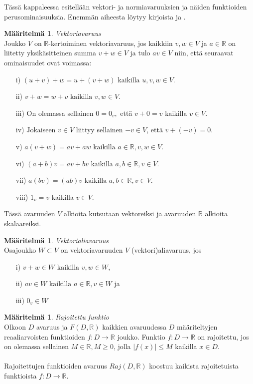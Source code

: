\documentclass[12pt,a4paper,leqno]{report}
\newcommand{\R}{\mathbb{R}}
\newcommand{\N}{\mathbb{N}}
\theoremstyle{plain}
\theoremstyle{definition}
\newtheorem{maar}[equation]{Määritelmä}
\newtheorem{esim}[equation]{Esimerkki}
\theoremstyle{remark}
\begin{document}
Tässä kappaleessa esitellään vektori- ja normiavaruuksien ja näiden funktioiden perusominaisuuksia. Enemmän aiheesta löytyy kirjoista \cite{Topo1} ja \cite{Topo2}.
\begin{maar}
\emph{Vektoriavaruus}\\
Joukko $V$ on $\R$-kertoiminen vektoriavaruus, jos kaikkiin $v,w\in V$ ja $a\in \R$ on liitetty yksikäsitteinen summa $v+w\in V$ ja tulo $av\in V$ niin, että seuraavat ominaisuudet ovat voimassa:
\begin{itemize}
\item[i)\phantom{iiv}] $(u+v)+w=u+(v+w)\text{ kaikilla }u,v,w\in V.$
\item[ii)\phantom{iv}] $v+w=w+v\text{ kaikilla }v,w\in V.$
\item[iii)\phantom{v}] On olemassa sellainen $0=0_{v},$ että $v+0=v\text{ kaikilla }v\in V.$
\item[iv)\phantom{ii}] Jokaiseen $v\in V $ liittyy sellainen $-v\in V$, että $v+(-v)=0$.
\item[v)\phantom{iii}] $a(v+w)=av+aw\text{ kaikilla }a\in\R, v,w\in V.$
\item[vi)\phantom{ii}] $(a+b)v=av+bv\text{ kaikilla }a,b\in\R, v\in V.$
\item[vii)\phantom{i}] $a(bv)=(ab)v\text{ kaikilla }a,b\in\R, v\in V.$
\item[viii)] $1_{v}=v$ kaikilla $v\in V.$
\end{itemize}
Tässä avaruuden $V$ alkioita kutsutaan vektoreiksi ja avaruuden $\R$ alkioita skalaareiksi.

\end{maar}
\begin{maar}
\emph{Vektorialiavaruus}\\
Osajoukko $W\subset V$ on vektoriavaruuden $V$ (vektori)aliavaruus, jos
\begin{itemize}
\item[i)\phantom{iiv}] $v+w\in W\text{ kaikilla }v,w\in W,$
\item[ii)\phantom{iv}] $av\in W\text{ kaikilla }a\in\R, v\in W$ ja
\item[iii)\phantom{v}] $0_{v}\in W$
\end{itemize}

\end{maar}
\begin{maar}
\emph{Rajoitettu funktio}\\
Olkoon $D$ avaruus ja $F(D,\R)$ kaikkien avaruudessa $D$ määriteltyjen 
reaaliarvoisten funktioiden $f\colon D\rightarrow \R$ joukko. 
Funktio $f\colon D\rightarrow \R$ on rajoitettu, 
jos on olemassa sellainen $M\in\R,M\geq 0$, 
jolla $|f(x)|\leq M$ kaikilla $x\in D$.\\\\
Rajoitettujen funktioiden avaruus $Raj(D,\R )$ koostuu kaikista rajoitetuista funktioista $f\colon D\rightarrow \R $.

\end{maar}
\end{document}
